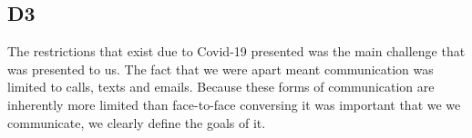 \subsection{D3}
    The restrictions that exist due to Covid-19 presented was the main challenge that was presented to us. The fact that we were apart meant communication was limited to calls, texts and emails. Because these forms of communication are inherently more limited than face-to-face conversing it was important that we we communicate, we clearly define the goals of it.